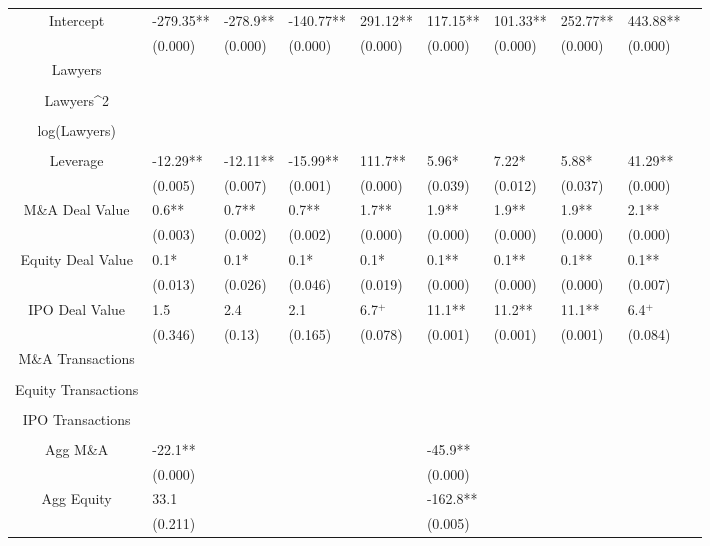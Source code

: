 \documentclass{article}
\begin{document}
\begin{table}[H]
\begin{tabular}{|clllllllll|}
Intercept & -279.35** & -278.9** & -140.77** & 291.12** & 117.15** & 101.33** & 252.77** & 443.88** & \\
   & (0.000) & (0.000) & (0.000) & (0.000) & (0.000) & (0.000) & (0.000) & (0.000) & \\
  Lawyers &  &  &  &  &  &  &  &  & \\
   &  &  &  &  &  &  &  &  & \\
  Lawyers^2 &  &  &  &  &  &  &  &  & \\
   &  &  &  &  &  &  &  &  & \\
  log(Lawyers) &  &  &  &  &  &  &  &  & \\
   &  &  &  &  &  &  &  &  & \\
  Leverage & -12.29** & -12.11** & -15.99** & 111.7** & 5.96* & 7.22* & 5.88* & 41.29** & \\
   & (0.005) & (0.007) & (0.001) & (0.000) & (0.039) & (0.012) & (0.037) & (0.000) & \\
  M\&A Deal Value & 0.6** & 0.7** & 0.7** & 1.7** & 1.9** & 1.9** & 1.9** & 2.1** & \\
   & (0.003) & (0.002) & (0.002) & (0.000) & (0.000) & (0.000) & (0.000) & (0.000) & \\
  Equity Deal Value & 0.1* & 0.1* & 0.1* & 0.1* & 0.1** & 0.1** & 0.1** & 0.1** & \\
   & (0.013) & (0.026) & (0.046) & (0.019) & (0.000) & (0.000) & (0.000) & (0.007) & \\
  IPO Deal Value & 1.5 & 2.4 & 2.1 & 6.7$^{+}$ & 11.1** & 11.2** & 11.1** & 6.4$^{+}$ & \\
   & (0.346) & (0.13) & (0.165) & (0.078) & (0.001) & (0.001) & (0.001) & (0.084) & \\
  M\&A Transactions &  &  &  &  &  &  &  &  & \\
   &  &  &  &  &  &  &  &  & \\
  Equity Transactions &  &  &  &  &  &  &  &  & \\
   &  &  &  &  &  &  &  &  & \\
  IPO Transactions &  &  &  &  &  &  &  &  & \\
   &  &  &  &  &  &  &  &  & \\
  Agg M\&A & -22.1** &  &  &  & -45.9** &  &  &  & \\
   & (0.000) &  &  &  & (0.000) &  &  &  & \\
  Agg Equity & 33.1 &  &  &  & -162.8** &  &  &  & \\
   & (0.211) &  &  &  & (0.005) &  &  &  & \\

\end{tabular}
\end{table}
\end{document}
